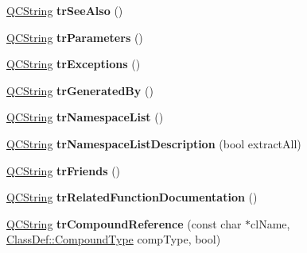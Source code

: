 \begin{DoxyCompactItemize}
\item 
\mbox{\label{class_translator_slovene_a1ce46cc456b48c73de18a4ae3fb27f0c}} 
\mbox{\hyperlink{class_q_c_string}{Q\+C\+String}} {\bfseries tr\+See\+Also} ()
\item 
\mbox{\label{class_translator_slovene_a71eb29a02d3704bca5347a113ecc9672}} 
\mbox{\hyperlink{class_q_c_string}{Q\+C\+String}} {\bfseries tr\+Parameters} ()
\item 
\mbox{\label{class_translator_slovene_ad90577cb41a9a100b5ee214af8144149}} 
\mbox{\hyperlink{class_q_c_string}{Q\+C\+String}} {\bfseries tr\+Exceptions} ()
\item 
\mbox{\label{class_translator_slovene_a9b86c2eaa8346310718a4cf8cde4df87}} 
\mbox{\hyperlink{class_q_c_string}{Q\+C\+String}} {\bfseries tr\+Generated\+By} ()
\item 
\mbox{\label{class_translator_slovene_a7df87eea0a251268a008c2f7d941a66d}} 
\mbox{\hyperlink{class_q_c_string}{Q\+C\+String}} {\bfseries tr\+Namespace\+List} ()
\item 
\mbox{\label{class_translator_slovene_a7827d8947e2e0d2a1a5f8f7e11c071d4}} 
\mbox{\hyperlink{class_q_c_string}{Q\+C\+String}} {\bfseries tr\+Namespace\+List\+Description} (bool extract\+All)
\item 
\mbox{\label{class_translator_slovene_a11acd96d83a6deb46fde3440ba56939a}} 
\mbox{\hyperlink{class_q_c_string}{Q\+C\+String}} {\bfseries tr\+Friends} ()
\item 
\mbox{\label{class_translator_slovene_a6fc3b643fff34f59d69254ab067e1d23}} 
\mbox{\hyperlink{class_q_c_string}{Q\+C\+String}} {\bfseries tr\+Related\+Function\+Documentation} ()
\item 
\mbox{\label{class_translator_slovene_a2e6ca351e84802282a8c88577fcab52b}} 
\mbox{\hyperlink{class_q_c_string}{Q\+C\+String}} {\bfseries tr\+Compound\+Reference} (const char $\ast$cl\+Name, \mbox{\hyperlink{class_class_def_ae70cf86d35fe954a94c566fbcfc87939}{Class\+Def\+::\+Compound\+Type}} comp\+Type, bool)

\end{DoxyCompactItemize}
